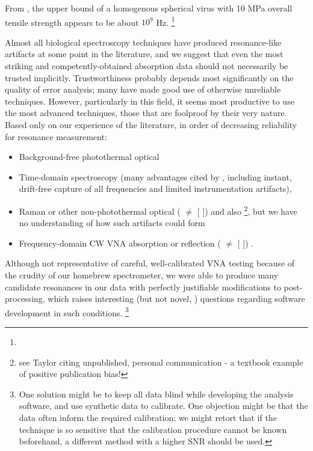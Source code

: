 \documentclass[paper.tex]{subfiles}
\begin{document}
\begin{multicols}{1}
From \cite{Spinning2008}, the upper bound of a homogenous spherical virus with 10 MPa overall tensile strength appears to be about $10^9$ Hz. \footnote{} 



Almost all biological spectroscopy techniques have produced resonance-like artifacts at some point in the literature, and we suggest that even the most striking and competently-obtained absorption data should not necessarily be trusted implicitly. Trustworthiness probably depends most significantly on the quality of error analysis; many have made good use of otherwise unreliable techniques. However, particularly in this field, it seems most productive to use the most advanced techniques, those that are foolproof by their very nature. Based only on our experience of the literature, in order of decreasing reliability for resonance measurement:

\begin{itemize}
\item Background-free photothermal optical \cite{Microwave1993a}\cite{Broadband1988}
\item Time-domain spectroscopy (many advantages cited by \cite{Time2003}, including instant, drift-free capture of all frequencies and limited instrumentation artifacts), \cite{Dielectric2004}\cite{Microwave1994}
\item Raman or other non-photothermal optical (\cite{optical1983} $\neq$ [\cite{Resonances1987} \cite{Dielectric1989}]) and also \footnote{see Taylor \cite{mechanisms1981} citing unpublished, personal communication - a textbook example of positive publication bias!}, but we have no understanding of how such artifacts could form
\item Frequency-domain CW VNA absorption or reflection (\cite{Microwave1982} $\neq$ [\cite{Resonances1987} \cite{Dielectric1989}]) \cite{Substitution1982} \cite{Millimeter1980}.
\end{itemize}

Although not representative of careful, well-calibrated VNA testing because of the crudity of our homebrew spectrometer, we were able to produce many candidate resonances in our data with perfectly justifiable modifications to post-processing, which raises interesting (but not novel\cite{Blindinga}, \cite{Reanalysis2020}\cite{statistical2020}) questions regarding software development in such conditions. \footnote{One solution might be to keep all data blind while developing the analysis software, and use synthetic data to calibrate. One objection might be that the data often inform the required calibration; we might retort that if the technique is so sensitive that the calibration procedure cannot be known beforehand, a different method with a higher SNR should be used.}



\end{multicols}
\end{document}
